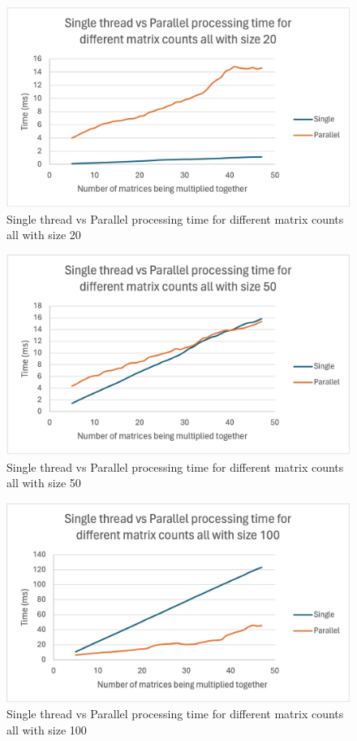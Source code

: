 \begin{figure}[H]
    \centering
    \includegraphics[width=0.8\columnwidth]{Figures/different_matrix_counts_size_20}
    \caption{Single thread vs Parallel processing time for different matrix counts all with size 20}
    \label{fig:different_matrix_counts_size 20}
\end{figure}

\begin{figure}[H]
    \centering
    \includegraphics[width=0.8\columnwidth]{Figures/different_matrix_counts_size_50}
    \caption{Single thread vs Parallel processing time for different matrix counts all with size 50}
    \label{fig:different_matrix_counts_size 50}
\end{figure}

\begin{figure}[H]
    \centering
    \includegraphics[width=0.8\columnwidth]{Figures/different_matrix_counts_size_100}
    \caption{Single thread vs Parallel processing time for different matrix counts all with size 100}
    \label{fig:different_matrix_counts_size 100}
\end{figure}

